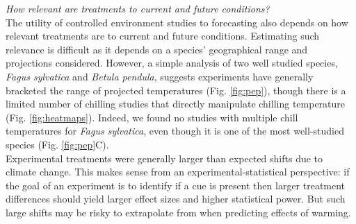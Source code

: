 \documentclass[11pt,letter]{article}
\begin{document}
\emph{How relevant are treatments to current and future conditions?}\\
The utility of controlled environment studies to forecasting also depends on how relevant treatments are to current and future conditions. Estimating such relevance is difficult as it depends on a species' geographical range and projections considered. However, a simple analysis of two well studied species, \emph{Fagus sylvatica} and \emph{Betula pendula}, suggests experiments have generally bracketed the range of projected temperatures (Fig. \ref{fig:pep}), though there is a limited number of chilling studies that directly manipulate chilling temperature (Fig. \ref{fig:heatmaps}). Indeed, we found no studies with multiple chill temperatures for \emph{Fagus sylvatica}, even though it is one of the most well-studied species (Fig. \ref{fig:pep}C). \\ %

Experimental treatments were generally larger than expected shifts due to climate change. This makes sense from an experimental-statistical perspective: if the goal of an experiment is to identify if a cue is present then larger treatment differences should yield larger effect sizes and higher statistical power. But such large shifts may be risky to extrapolate from when predicting effects of warming.   %
\end{document}
